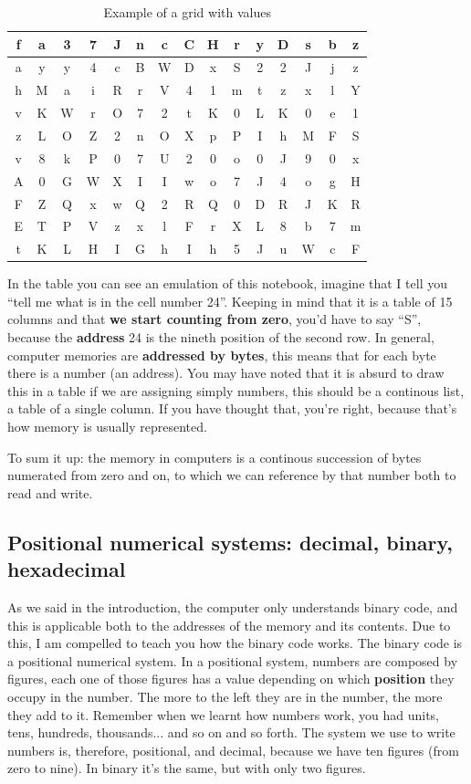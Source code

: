 \documentclass[a4paper]{article}
\begin{document}
\begin{table}[H]
    \centering
    \begin{tabular}{|c|c|c|c|c|c|c|c|c|c|c|c|c|c|c|}
        \hline
f&a&3&7&J&n&c&C&H&r&y&D&s&b&z\\\hline
a&y&y&4&c&B&W&D&x&S&2&2&J&j&z\\\hline
h&M&a&i&R&r&V&4&1&m&t&z&x&l&Y\\\hline
v&K&W&r&O&7&2&t&K&0&L&K&0&e&1\\\hline
z&L&O&Z&2&n&O&X&p&P&I&h&M&F&S\\\hline
v&8&k&P&0&7&U&2&0&o&0&J&9&0&x\\\hline
A&0&G&W&X&I&I&w&o&7&J&4&o&g&H\\\hline
F&Z&Q&x&w&Q&2&R&Q&0&D&R&J&K&R\\\hline
E&T&P&V&z&x&l&F&r&X&L&8&b&7&m\\\hline
t&K&L&H&I&G&h&I&h&5&J&u&W&c&F\\\hline
    \end{tabular}
    \caption{Example of a grid with values}
    \label{tab:notebookSimulation}
\end{table}

In the table you can see an emulation of this notebook, imagine that I tell
you ``tell me what is in the cell number 24''. Keeping in mind that it is
a table of 15 columns and that \textbf{we start counting from zero}, you'd have
to say ``S'', because the \textbf{address} 24 is the nineth position of the
second row. In general, computer memories are \textbf{addressed by bytes}, this
means that for each byte there is a number (an address). You may have noted that
it is absurd to draw this in a table if we are assigning simply numbers, this
should be a continous list, a table of a single column. If you have thought
that, you're right, because that's how memory is usually represented.

To sum it up: the memory in computers is a continous succession of bytes
numerated from zero and on, to which we can reference by that number
both to read and write.

\subsection{Positional numerical systems: decimal, binary, hexadecimal}
\label{numericSystems}
As we said in the introduction, the computer only understands binary code,
and this is applicable both to the addresses of the memory and its contents.
Due to this, I am compelled to teach you how the binary code works. The binary
code is a positional numerical system. In a positional system, numbers are
composed by figures, each one of those figures has a value depending on which
\textbf{position} they occupy in the number. The more to the left they are in
the number, the more they add to it. Remember when we learnt how numbers work,
you had units, tens, hundreds, thousands... and so on and so forth. The system
we use to write numbers is, therefore, positional, and decimal, because we have
ten figures (from zero to nine). In binary it's the same, but with only two
figures.
\end{document}

